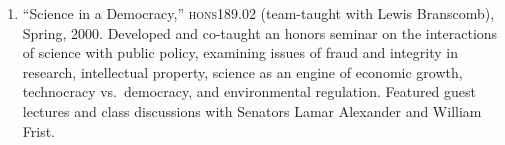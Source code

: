 \begin{enumerate}
\item ``Science in a Democracy,'' \textsc{hons189.02} (team-taught with Lewis Branscomb), Spring, 2000. Developed and co-taught an honors seminar on the interactions of science with public policy, examining issues of fraud and integrity in research, intellectual property, science as an engine of economic growth, technocracy vs.\ democracy, and environmental regulation. Featured guest lectures and class discussions with Senators Lamar Alexander and William Frist.
\end{enumerate}